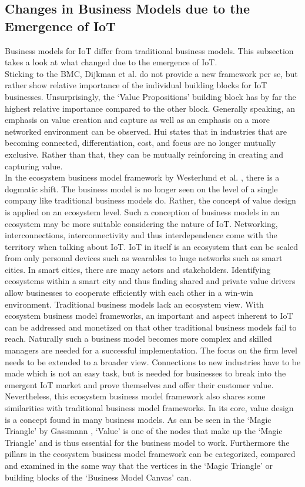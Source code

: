 	\subsection{Changes in Business Models due to the Emergence of IoT}
	\vspace{-1em}
		Business models for IoT differ from traditional business models. This subsection takes a look at what changed due to the emergence of IoT.\\
		Sticking to the BMC, Dijkman et al. \cite{dijkman} do not provide a new framework per se, but rather show relative importance of the individual building blocks for IoT businesses. Unsurprisingly, the `Value Propositions' building block has by far the highest relative importance compared to the other block. Generally speaking, an emphasis on value creation and capture as well as an emphasis on a more networked environment can be observed. Hui \cite{hui} states that in industries that are becoming connected, differentiation, cost, and focus are no longer mutually exclusive. Rather than that, they can be mutually reinforcing in creating and capturing value.\\
		In the ecosystem business model framework by Westerlund et al. \cite{westerlund}, there is a dogmatic shift. The business model is no longer seen on the level of a single company like traditional business models do. Rather, the concept of value design is applied on an ecosystem level. Such a conception of business models in an ecosystem may be more suitable considering the nature of IoT. Networking, interconnections, interconnectivity and thus interdependence come with the territory when talking about IoT. IoT in itself is an ecosystem that can be scaled from only personal devices such as wearables to huge networks such as smart cities. In smart cities, there are many actors and stakeholders. Identifying ecosystems within a smart city and thus finding shared and private value drivers allow businesses to cooperate efficiently with each other in a win-win environment. Traditional business models lack an ecosystem view. With ecosystem business model frameworks, an important and aspect inherent to IoT can be addressed and monetized on that other traditional business models fail to reach. Naturally such a business model becomes more complex and skilled managers are needed for a successful implementation. The focus on the firm level needs to be extended to a broader view. Connections to new industries have to be made which is not an easy task, but is needed for businesses to break into the emergent IoT market and prove themselves and offer their customer value. Nevertheless, this ecosystem business model framework also shares some similarities with traditional business model frameworks. In its core, value design is a concept found in many business models. As can be seen in the `Magic Triangle' by Gassmann \cite{gassmann55}, `Value' is one of the nodes that make up the `Magic Triangle' and is thus essential for the business model to work. Furthermore the pillars in the ecosystem business model framework can be categorized, compared and examined in the same way that the vertices in the `Magic Triangle' or building blocks of the `Business Model Canvas' can.\\
